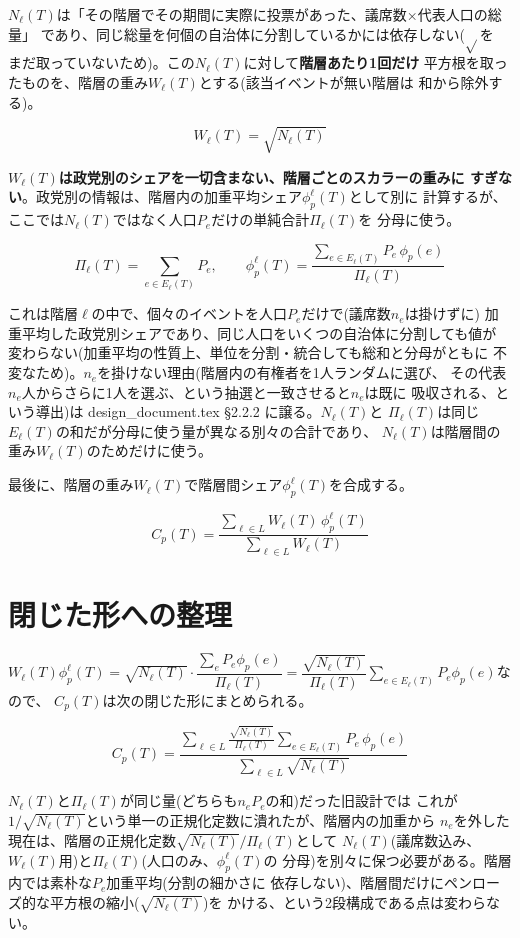 \documentclass[a4paper,11pt]{ltjsarticle}
\begin{document}
$N_\ell(T)$は「その階層でその期間に実際に投票があった、議席数×代表人口の総量」
であり、同じ総量を何個の自治体に分割しているかには依存しない($\sqrt{}$を
まだ取っていないため)。この$N_\ell(T)$に対して\textbf{階層あたり1回だけ}
平方根を取ったものを、階層の重み$W_\ell(T)$とする(該当イベントが無い階層は
和から除外する)。

$$W_\ell(T) = \sqrt{N_\ell(T)}$$

\textbf{$W_\ell(T)$は政党別のシェアを一切含まない、階層ごとのスカラーの重みに
すぎない}。政党別の情報は、階層内の加重平均シェア$\phi_p^\ell(T)$として別に
計算するが、ここでは$N_\ell(T)$ではなく人口$P_e$だけの単純合計$\Pi_\ell(T)$を
分母に使う。

$$\Pi_\ell(T) = \sum_{e\in E_\ell(T)} P_e, \qquad
\phi_p^\ell(T) = \frac{\displaystyle\sum_{e\in E_\ell(T)} P_e\,\phi_p(e)}{\Pi_\ell(T)}$$

これは階層$\ell$の中で、個々のイベントを人口$P_e$だけで(議席数$n_e$は掛けずに)
加重平均した政党別シェアであり、同じ人口をいくつの自治体に分割しても値が
変わらない(加重平均の性質上、単位を分割・統合しても総和と分母がともに
不変なため)。$n_e$を掛けない理由(階層内の有権者を1人ランダムに選び、
その代表$n_e$人からさらに1人を選ぶ、という抽選と一致させると$n_e$は既に
吸収される、という導出)は design\_document.tex \S2.2.2 に譲る。$N_\ell(T)$と
$\Pi_\ell(T)$は同じ$E_\ell(T)$の和だが分母に使う量が異なる別々の合計であり、
$N_\ell(T)$は階層間の重み$W_\ell(T)$のためだけに使う。

最後に、階層の重み$W_\ell(T)$で階層間シェア$\phi_p^\ell(T)$を合成する。

$$C_p(T) = \frac{\displaystyle\sum_{\ell\in L} W_\ell(T)\,\phi_p^\ell(T)}
                  {\displaystyle\sum_{\ell\in L} W_\ell(T)}$$

\section{閉じた形への整理}

$W_\ell(T)\phi_p^\ell(T) = \sqrt{N_\ell(T)}\cdot\dfrac{\sum_e P_e\phi_p(e)}{\Pi_\ell(T)}
= \dfrac{\sqrt{N_\ell(T)}}{\Pi_\ell(T)}\sum_{e\in E_\ell(T)} P_e\phi_p(e)$なので、
$C_p(T)$は次の閉じた形にまとめられる。

$$C_p(T) = \frac{\displaystyle\sum_{\ell\in L} \frac{\sqrt{N_\ell(T)}}{\Pi_\ell(T)}
                  \sum_{e\in E_\ell(T)} P_e\,\phi_p(e)}
                  {\displaystyle\sum_{\ell\in L} \sqrt{N_\ell(T)}}$$

$N_\ell(T)$と$\Pi_\ell(T)$が同じ量(どちらも$n_eP_e$の和)だった旧設計では
これが$1/\sqrt{N_\ell(T)}$という単一の正規化定数に潰れたが、階層内の加重から
$n_e$を外した現在は、階層の正規化定数$\sqrt{N_\ell(T)}/\Pi_\ell(T)$として
$N_\ell(T)$(議席数込み、$W_\ell(T)$用)と$\Pi_\ell(T)$(人口のみ、$\phi_p^\ell(T)$の
分母)を別々に保つ必要がある。階層内では素朴な$P_e$加重平均(分割の細かさに
依存しない)、階層間だけにペンローズ的な平方根の縮小($\sqrt{N_\ell(T)}$)を
かける、という2段構成である点は変わらない。
\end{document}
